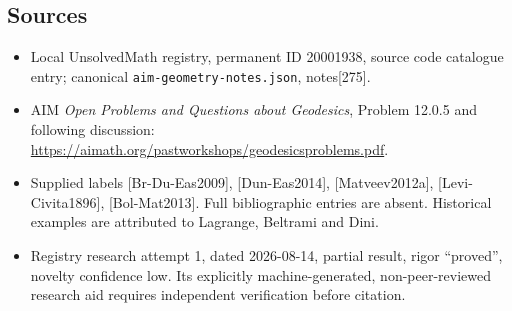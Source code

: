 \documentclass[11pt]{article}
\begin{document}
\subsection{Sources}
\begin{itemize}
\item Local UnsolvedMath registry, permanent ID 20001938, source code catalogue entry; canonical \texttt{aim-geometry-notes.json}, notes[275].
\item AIM \emph{Open Problems and Questions about Geodesics}, Problem 12.0.5 and following discussion: \url{https://aimath.org/pastworkshops/geodesicsproblems.pdf}.
\item Supplied labels [Br-Du-Eas2009], [Dun-Eas2014], [Matveev2012a], [Levi-Civita1896], [Bol-Mat2013]. Full bibliographic entries are absent. Historical examples are attributed to Lagrange, Beltrami and Dini.
\item Registry research attempt 1, dated 2026-08-14, partial result, rigor ``proved'', novelty confidence low. Its explicitly machine-generated, non-peer-reviewed research aid requires independent verification before citation.
\end{itemize}
\end{document}
